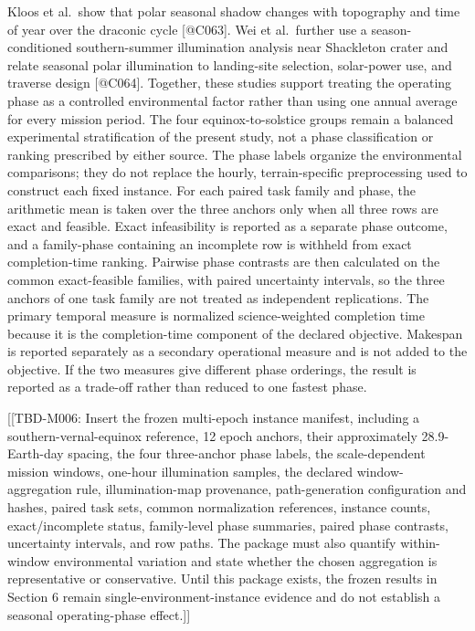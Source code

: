 \documentclass[
  11pt,
]{article}
\begin{document}
Kloos et al.~show that polar seasonal shadow changes with topography and
time of year over the draconic cycle {[}@C063{]}. Wei et al.~further use
a season-conditioned southern-summer illumination analysis near
Shackleton crater and relate seasonal polar illumination to landing-site
selection, solar-power use, and traverse design {[}@C064{]}. Together,
these studies support treating the operating phase as a controlled
environmental factor rather than using one annual average for every
mission period. The four equinox-to-solstice groups remain a balanced
experimental stratification of the present study, not a phase
classification or ranking prescribed by either source. The phase labels
organize the environmental comparisons; they do not replace the hourly,
terrain-specific preprocessing used to construct each fixed instance.
For each paired task family and phase, the arithmetic mean is taken over
the three anchors only when all three rows are exact and feasible. Exact
infeasibility is reported as a separate phase outcome, and a
family-phase containing an incomplete row is withheld from exact
completion-time ranking. Pairwise phase contrasts are then calculated on
the common exact-feasible families, with paired uncertainty intervals,
so the three anchors of one task family are not treated as independent
replications. The primary temporal measure is normalized
science-weighted completion time because it is the completion-time
component of the declared objective. Makespan is reported separately as
a secondary operational measure and is not added to the objective. If
the two measures give different phase orderings, the result is reported
as a trade-off rather than reduced to one fastest phase.

{[}{[}TBD-M006: Insert the frozen multi-epoch instance manifest,
including a southern-vernal-equinox reference, 12 epoch anchors, their
approximately 28.9-Earth-day spacing, the four three-anchor phase
labels, the scale-dependent mission windows, one-hour illumination
samples, the declared window-aggregation rule, illumination-map
provenance, path-generation configuration and hashes, paired task sets,
common normalization references, instance counts, exact/incomplete
status, family-level phase summaries, paired phase contrasts,
uncertainty intervals, and row paths. The package must also quantify
within-window environmental variation and state whether the chosen
aggregation is representative or conservative. Until this package
exists, the frozen results in Section 6 remain
single-environment-instance evidence and do not establish a seasonal
operating-phase effect.{]}{]}
\end{document}
